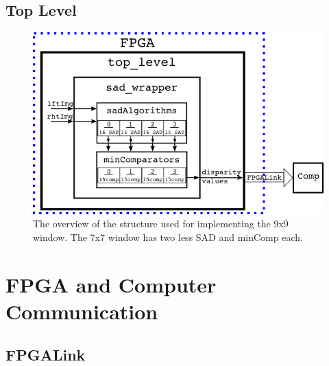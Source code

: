 \subsection{Top Level}

\begin{figure}[h]
	\begin{center}
		\includegraphics[width=150mm]{figures/top_level_rtl.png}
		\captionfonts
		\caption{The overview of the structure used for implementing the 9x9 window. The 7x7 window has two less SAD and minComp each.}
		\label{fig:topLevel_rtl}
	\end{center}
\end{figure}

\section{FPGA and Computer Communication}



\subsection{FPGALink}



